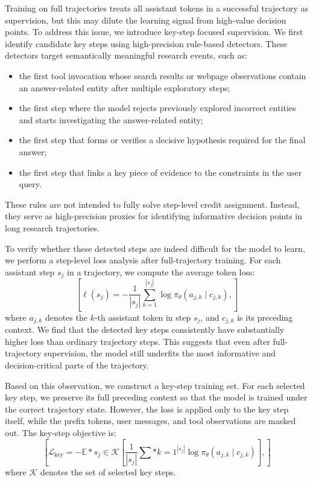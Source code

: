 \documentclass[]{selfevolagent}
\theoremstyle{plain}
\theoremstyle{definition}
\theoremstyle{remark}
\begin{document}
Training on full trajectories treats all assistant tokens in a successful trajectory as supervision, but this may dilute the learning signal from high-value decision points. To address this issue, we introduce key-step focused supervision. We first identify candidate key steps using high-precision rule-based detectors. These detectors target semantically meaningful research events, such as:
\begin{itemize}
\item the first tool invocation whose search results or webpage observations contain an answer-related entity after multiple exploratory steps;
\item the first step where the model rejects previously explored incorrect entities and starts investigating the answer-related entity;
\item the first step that forms or verifies a decisive hypothesis required for the final answer;
\item the first step that links a key piece of evidence to the constraints in the user query.
\end{itemize}

These rules are not intended to fully solve step-level credit assignment. Instead, they serve as high-precision proxies for identifying informative decision points in long research trajectories.

To verify whether these detected steps are indeed difficult for the model to learn, we perform a step-level loss analysis after full-trajectory training. For each assistant step $s_j$ in a trajectory, we compute the average token loss:
$$
[
\ell(s_j) =
-\frac{1}{|s_j|}
\sum_{k=1}^{|s_j|}
\log \pi_{\theta}(a_{j,k} \mid c_{j,k}),
]
$$
where $a_{j,k}$ denotes the $k$-th assistant token in step $s_j$, and $c_{j,k}$ is its preceding context. We find that the detected key steps consistently have substantially higher loss than ordinary trajectory steps. This suggests that even after full-trajectory supervision, the model still underfits the most informative and decision-critical parts of the trajectory.

Based on this observation, we construct a key-step training set. For each selected key step, we preserve its full preceding context so that the model is trained under the correct trajectory state. However, the loss is applied only to the key step itself, while the prefix tokens, user messages, and tool observations are masked out. The key-step objective is:
$$
[
\mathcal{L}_{\text{key}} =
-\mathbb{E}*{s_j \in \mathcal{K}}
\left[
\frac{1}{|s_j|}
\sum*{k=1}^{|s_j|}
\log \pi_{\theta}(a_{j,k} \mid c_{j,k})
\right],
]
$$
where $\mathcal{K}$ denotes the set of selected key steps.
\end{document}
